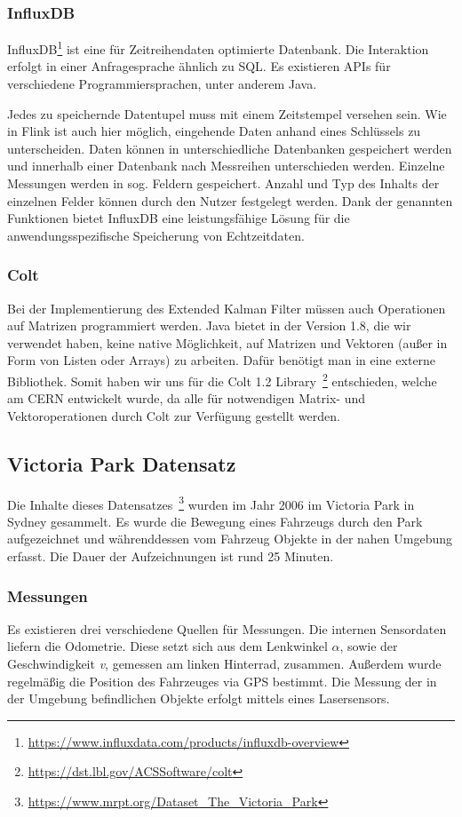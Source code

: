 \documentclass[11pt]{article}
\begin{document}
\subsubsection{InfluxDB}
InfluxDB\footnote{\url{https://www.influxdata.com/products/influxdb-overview}} ist eine für Zeitreihendaten optimierte Datenbank. Die Interaktion erfolgt in einer Anfragesprache ähnlich zu SQL. Es existieren APIs für verschiedene Programmiersprachen, unter anderem Java. 

Jedes zu speichernde Datentupel muss mit einem Zeitstempel versehen sein. Wie in Flink ist auch hier möglich, eingehende Daten anhand eines Schlüssels zu unterscheiden. Daten können in unterschiedliche Datenbanken gespeichert werden und innerhalb einer Datenbank nach Messreihen unterschieden werden. Einzelne Messungen werden in sog. Feldern gespeichert. Anzahl und Typ des Inhalts der einzelnen Felder können durch den Nutzer festgelegt werden. Dank der genannten Funktionen bietet InfluxDB eine leistungsfähige Lösung für die anwendungsspezifische Speicherung von Echtzeitdaten.

\subsubsection{Colt}
Bei der Implementierung des Extended Kalman Filter müssen auch Operationen auf Matrizen programmiert werden. Java bietet in der Version 1.8, die wir verwendet haben, keine native Möglichkeit, auf Matrizen und Vektoren (außer in Form von Listen oder Arrays) zu arbeiten. Dafür benötigt man in eine externe Bibliothek. Somit haben wir uns für die Colt 1.2 Library~\footnote{\url{https://dst.lbl.gov/ACSSoftware/colt}} entschieden, welche am CERN entwickelt wurde, da alle für notwendigen Matrix- und Vektoroperationen durch Colt zur Verfügung gestellt werden.

\subsection{Victoria Park Datensatz}\label{Datensatz}
Die Inhalte dieses Datensatzes~\footnote{\url{https://www.mrpt.org/Dataset_The_Victoria_Park}} wurden im Jahr 2006 im Victoria Park in Sydney gesammelt. Es wurde die Bewegung eines Fahrzeugs durch den Park aufgezeichnet und währenddessen vom Fahrzeug Objekte in der nahen Umgebung erfasst. Die Dauer der Aufzeichnungen ist rund 25 Minuten.

\subsubsection{Messungen}
Es existieren drei verschiedene Quellen für Messungen. Die internen Sensordaten liefern die Odometrie. Diese setzt sich aus dem Lenkwinkel \(\alpha\), sowie der Geschwindigkeit \textit{v}, gemessen am linken Hinterrad, zusammen. Außerdem wurde regelmäßig die Position des Fahrzeuges via GPS bestimmt. Die Messung der in der Umgebung befindlichen Objekte erfolgt mittels eines Lasersensors.
\end{document}
